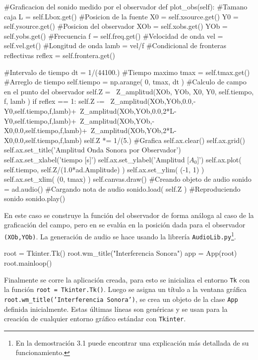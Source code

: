 \begin{listing}[style=python, numbers = none]
  #Graficacion del sonido medido por el observador
  def plot_obs(self):
    #Tamano caja
    L = self.Lbox.get()
    #Posicion de la fuente
    X0 = self.xsource.get()
    Y0 = self.ysource.get()
    #Posicion del observador
    XOb = self.xobs.get()
    YOb = self.yobs.get()
    #Frecuencia
    f = self.freq.get()
    #Velocidad de onda
    vel = self.vel.get()
    #Longitud de onda
    lamb = vel/f
    #Condicional de fronteras reflectivas
    reflex = self.frontera.get()
    
    #Intervalo de tiempo
    dt = 1/(44100.)
    #Tiempo maximo
    tmax = self.tmax.get()
    #Arreglo de tiempo
    self.tiempo = np.arange( 0, tmax, dt )
    #Calculo de campo en el punto del observador
    self.Z = \
    Z_amplitud(XOb, YOb, X0, Y0, self.tiempo, f, lamb )
    if reflex == 1:
      self.Z -= \
      Z_amplitud(XOb,YOb,0.0,-Y0,self.tiempo,f,lamb)+\
      Z_amplitud(XOb,YOb,0.0,2*L-Y0,self.tiempo,f,lamb)+\
      Z_amplitud(XOb,YOb,-X0,0.0,self.tiempo,f,lamb)+\
      Z_amplitud(XOb,YOb,2*L-X0,0.0,self.tiempo,f,lamb)
      self.Z *= 1/(5.)
    #Grafica
    self.ax.clear()
    self.ax.grid()
    self.ax.set_title('Amplitud Onda Sonora por Observador')
    self.ax.set_xlabel('tiempo [s]')
    self.ax.set_ylabel('Amplitud [$A_0$]')
    self.ax.plot( self.tiempo, self.Z/(1.0*ad.Amplitude) )
    self.ax.set_ylim( (-1, 1) )
    self.ax.set_xlim( (0, tmax) )
    self.canvas.draw()
    #Creando objeto de audio
    sonido = ad.audio()
    #Cargando nota de audio
    sonido.load( self.Z )
    #Reproduciendo sonido
    sonido.play()
\end{listing}
En este caso se construye la función del observador de forma análoga al 
caso de la graficación del campo, pero en se evalúa en la posición dada
para el observador \texttt{(XOb,YOb)}. La generación de audio se hace usando
la librería \texttt{AudioLib.py}\footnote{En la demostración 3.1 puede 
encontrar una explicación más detallada de su funcionamiento.}.


\begin{listing}[style=python, numbers = none]
root = Tkinter.Tk()
root.wm_title("Interferencia Sonora")
app = App(root)
root.mainloop()
\end{listing}
Finalmente se corre la aplicación creada, para esto se inicializa el 
entorno \texttt{Tk} con la función \texttt{root = Tkinter.Tk()}. Luego se 
asigna un título a la ventana gráfica \texttt{root.wm\_title('Interferencia 
Sonora')}, se crea un objeto de la clase \texttt{App} definida inicialmente.
Estas últimas líneas son genéricas y se usan para la creación de cualquier
entorno gráfico estándar con \texttt{Tkinter}.

